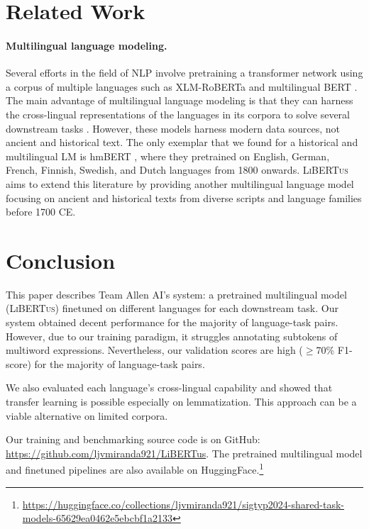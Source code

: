\documentclass[11pt]{article}
\newcommand{\libertus}{\textsc{LiBERTus}}
\newcommand{\teamname}{Allen AI}
\newcommand{\githuburl}{\url{https://github.com/ljvmiranda921/LiBERTus}}
\begin{document}
\section{Related Work}

\paragraph{Multilingual language modeling.}
Several efforts in the field of NLP involve pretraining a transformer network \cite{vaswani-etal-2017-attention} using a corpus of multiple languages such as XLM-RoBERTa \cite{liu-etal-2019-roberta} and multilingual BERT \cite{conneau-etal-2020-unsupervised}.
The main advantage of multilingual language modeling is that they can harness the cross-lingual representations of the languages in its corpora to solve several downstream tasks \cite{chang-etal-2022-geometry}.
However, these models harness modern data sources, not ancient and historical text.
The only exemplar that we found for a historical and multilingual LM is hmBERT \cite{schweter-etal-2022-hmbert}, where they pretrained on English, German, French, Finnish, Swedish, and Dutch languages from 1800 onwards.
\libertus{} aims to extend this literature by providing another multilingual language model focusing on ancient and historical texts from diverse scripts and language families before 1700 CE.

\section{Conclusion}

This paper describes Team \teamname{}'s system: a pretrained multilingual model (\libertus{}) finetuned on different languages for each downstream task.
Our system obtained decent performance for the majority of language-task pairs.
However, due to our training paradigm, it struggles annotating subtokens of multiword expressions.
Nevertheless, our validation scores are high ($\geq$70\% F1-score) for the majority of language-task pairs.

We also evaluated each language's cross-lingual capability and showed that transfer learning is possible especially on lemmatization.
This approach can be a viable alternative on limited corpora.

Our training and benchmarking source code is on GitHub: \githuburl{}.
The pretrained multilingual model and finetuned pipelines are also available on HuggingFace.\footnote[2]{\url{https://huggingface.co/collections/ljvmiranda921/sigtyp2024-shared-task-models-65629ea0462e5ebcbf1a2133}}
\end{document}
